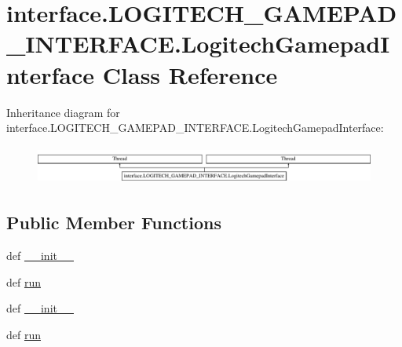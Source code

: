 \hypertarget{classinterface_1_1LOGITECH__GAMEPAD__INTERFACE_1_1LogitechGamepadInterface}{}\section{interface.\+L\+O\+G\+I\+T\+E\+C\+H\+\_\+\+G\+A\+M\+E\+P\+A\+D\+\_\+\+I\+N\+T\+E\+R\+F\+A\+C\+E.\+Logitech\+Gamepad\+Interface Class Reference}
\label{classinterface_1_1LOGITECH__GAMEPAD__INTERFACE_1_1LogitechGamepadInterface}
Inheritance diagram for interface.\+L\+O\+G\+I\+T\+E\+C\+H\+\_\+\+G\+A\+M\+E\+P\+A\+D\+\_\+\+I\+N\+T\+E\+R\+F\+A\+C\+E.\+Logitech\+Gamepad\+Interface\+:\begin{figure}[H]
\begin{center}
\leavevmode
\includegraphics[height=1.281464cm]{classinterface_1_1LOGITECH__GAMEPAD__INTERFACE_1_1LogitechGamepadInterface}
\end{center}
\end{figure}
\subsection*{Public Member Functions}
\begin{DoxyCompactItemize}
\item 
def \hyperlink{classinterface_1_1LOGITECH__GAMEPAD__INTERFACE_1_1LogitechGamepadInterface_ae9cbbecadf735d90cf9834b4df772d2d}{\+\_\+\+\_\+init\+\_\+\+\_\+}
\item 
def \hyperlink{classinterface_1_1LOGITECH__GAMEPAD__INTERFACE_1_1LogitechGamepadInterface_a759473f1f4a54af72dabd5dcfa3f5d3b}{run}
\item 
def \hyperlink{classinterface_1_1LOGITECH__GAMEPAD__INTERFACE_1_1LogitechGamepadInterface_ae9cbbecadf735d90cf9834b4df772d2d}{\+\_\+\+\_\+init\+\_\+\+\_\+}
\item 
def \hyperlink{classinterface_1_1LOGITECH__GAMEPAD__INTERFACE_1_1LogitechGamepadInterface_a759473f1f4a54af72dabd5dcfa3f5d3b}{run}
\end{DoxyCompactItemize}
